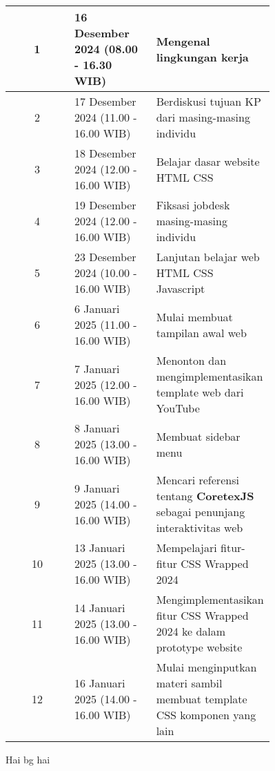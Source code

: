 \documentclass{file/KP-ITS}
\theoremstyle{definition}
\theoremstyle{definition}
\theoremstyle{plain}
\begin{document}
\begin{table}[h!]
    \centering
    \begin{tabular}{|c|p{0.31\linewidth}|p{0.45\linewidth}|}
        \hline
        1 & 16 Desember 2024 (08.00 - 16.30 WIB) & Mengenal lingkungan kerja \\
\hline
2 & 17 Desember 2024 (11.00 - 16.00 WIB) & Berdiskusi tujuan KP dari masing-masing individu \\
\hline
3 & 18 Desember 2024 (12.00 - 16.00 WIB) & Belajar dasar website HTML CSS \\
\hline
4 & 19 Desember 2024 (12.00 - 16.00 WIB) & Fiksasi jobdesk masing-masing individu \\
\hline
5 & 23 Desember 2024 (10.00 - 16.00 WIB) & Lanjutan belajar web HTML CSS Javascript \\
\hline
6 & 6 Januari 2025 (11.00 - 16.00 WIB) & Mulai membuat tampilan awal web \\
\hline
7 & 7 Januari 2025 (12.00 - 16.00 WIB) & Menonton dan mengimplementasikan template web dari YouTube \\
\hline
8 & 8 Januari 2025 (13.00 - 16.00 WIB) & Membuat sidebar menu \\
\hline
9 & 9 Januari 2025 (14.00 - 16.00 WIB) & Mencari referensi tentang \textbf{CoretexJS} sebagai penunjang interaktivitas web \\
\hline
10 & 13 Januari 2025 (13.00 - 16.00 WIB) & Mempelajari fitur-fitur CSS Wrapped 2024 \\
\hline
11 & 14 Januari 2025 (13.00 - 16.00 WIB) & Mengimplementasikan fitur CSS Wrapped 2024 ke dalam prototype website \\
\hline
12 & 16 Januari 2025 (14.00 - 16.00 WIB) & Mulai menginputkan materi sambil membuat template CSS komponen yang lain \\
\hline
    \end{tabular}
\end{table}

\pagebreak
{}
Hai bg hai
\end{document}
